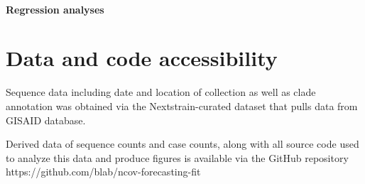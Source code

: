 \documentclass[11pt,oneside,letterpaper]{article}
\begin{document}
\paragraph{Regression analyses}



\section*{Data and code accessibility}

Sequence data including date and location of collection as well as clade annotation was obtained via the Nextstrain-curated
dataset that pulls data from GISAID database. 


Derived data of sequence counts and case counts, along with all source code used to analyze
this data and produce figures is available via the GitHub repository https://github.com/blab/ncov-forecasting-fit




\end{document}
